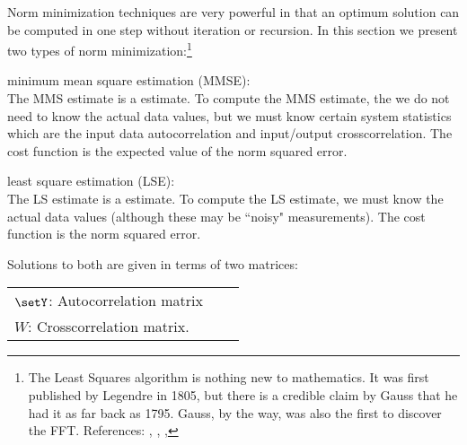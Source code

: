 Norm minimization techniques are very powerful
in that an optimum solution can be computed
in one step without iteration or recursion.
In this section we present two types of norm minimization:\footnote{
   The Least Squares algorithm is nothing new to mathematics.
   It was first published by Legendre in 1805, but there is a credible claim by Gauss
   that he had it as far back as 1795.
   Gauss, by the way, was also the first to discover the FFT.
   References: 
   ,
   ,
   ,
   }

\begin{enume}
  \item minimum mean square estimation (MMSE): \\
        The MMS estimate is a  estimate.
        To compute the MMS estimate, the we do not need to know
        the actual data values, but we must know certain system statistics
        which are the
        input data autocorrelation and input/output crosscorrelation.
        The cost function is the expected value of the norm squared error.
   \item least square estimation (LSE): \\
        The LS estimate is a  estimate.
        To compute the LS estimate, we must know the actual data values
        (although these may be ``noisy" measurements).
        The cost function is the norm squared error.
\end{enume}

Solutions to both are given in terms of two matrices:

\begin{tabular}{lll}
   $\setY$: Autocorrelation matrix \\
   $W$: Crosscorrelation matrix.
\end{tabular}

